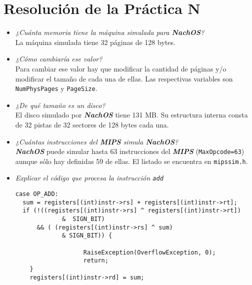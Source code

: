 \chapter{Resolución de la Práctica N}
\begin{itemize}
    \item \textit{¿Cuánta memoria tiene la máquina simulada para \textbf{\textit{NachOS}}?}\\
    La máquina simulada tiene 32 páginas de 128 bytes.
    \item \textit{¿Cómo cambiaría ese valor?}\\
    Para cambiar ese valor hay que modificar la cantidad de páginas y/o modificar el tamaño de cada una de ellas. Las respectivas variables son \texttt{NumPhysPages} y \texttt{PageSize}. 
    \item \textit{¿De qué tamaño es un disco?}\\
    El disco simulado por \textbf{\textit{NachOS}} tiene 131 MB. Su estructura interna consta de 32 pistas de 32 sectores de 128 bytes cada una.
    \item \textit{¿Cuántas instrucciones del \textbf{\textit{MIPS}} simula \textbf{\textit{NachOS}}?}\\
\textbf{\textit{NachOS}} puede simular hasta 63 instrucciones del \textbf{\textit{MIPS}} (\texttt{MaxOpcode=63}) aunque sólo hay definidas 59 de ellas. El listado se encuentra en \texttt{mipssim.h}.
    \item \textit{Explicar el código que procesa la instrucción \texttt{add}}\\
\begin{lstlisting}[style=C]
case OP_ADD:
  sum = registers[(int)instr->rs] + registers[(int)instr->rt];
  if (!((registers[(int)instr->rs] ^ registers[(int)instr->rt])
             &  SIGN_BIT) 
      && ( (registers[(int)instr->rs] ^ sum)
             & SIGN_BIT)) {

                   RaiseException(OverflowException, 0);
                   return;
    }
    registers[(int)instr->rd] = sum;
\end{lstlisting}

   
\end{itemize}

    

